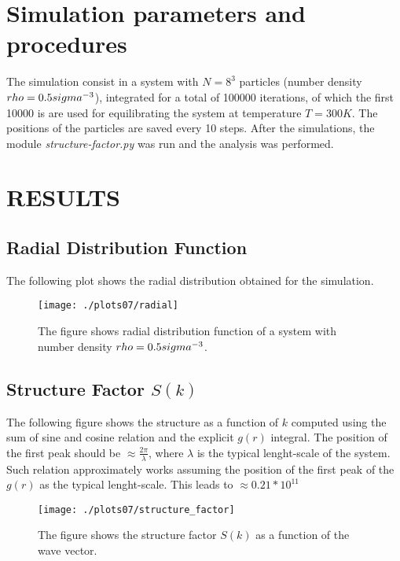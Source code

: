 \documentclass[aps,pra,reprint, onecolumn, rmp]{revtex4-2}
\begin{document}
\section{Simulation parameters and procedures}
The simulation consist in a system with $N=8^3$ particles (number density $\\rho = 0.5 \\sigma^{-3}$), integrated for a total of 100000 iterations, of which the first 10000 is are used for equilibrating the system at temperature $T=300K$. The positions of the particles are saved every 10 steps.
After the simulations, the module \textit{structure-factor.py} was run and the analysis was performed.


\section{RESULTS}
\subsection{Radial Distribution Function}
The following plot shows the radial distribution obtained for the simulation. 

\begin{figure}[h]
          \centering
          \texttt{[image: ./plots07/radial]}
          \caption{The figure shows radial distribution function of a system with number density $\\rho = 0.5 \\sigma^{-3}$.}
\end{figure}


\subsection{Structure Factor $S(k)$}
The following figure shows the structure as a function of $k$ computed using the sum of sine and cosine relation and the explicit $g(r)$ integral. The position of the first peak should be $\approx \frac{2\pi}{\lambda}$, where $\lambda$ is the typical lenght-scale of the system. Such relation approximately works assuming the position of the first peak of the $g(r)$ as the typical lenght-scale. This leads to $\approx 0.21 * 10^{11}$

\begin{figure}[h]
          \centering
          \texttt{[image: ./plots07/structure\_factor]}
          \caption{The figure shows the structure factor $S(k)$ as a function of the wave vector.}
\end{figure}
\end{document}
